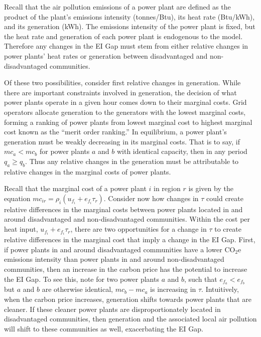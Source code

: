 Recall that the air pollution emissions of a power plant are defined as the product of the plant's emissions intensity (tonnes/Btu), its heat rate (Btu/kWh), and its generation (kWh). The emissions intensity of the power plant is fixed, but the heat rate and generation of each power plant is endogenous to the model. Therefore any changes in the EI Gap must stem from either relative changes in power plants' heat rates or generation between disadvantaged and non-disadvantaged communities. 

Of these two possibilities, consider first relative changes in generation. While there are important constraints involved in generation, the decision of what power plants operate in a given hour comes down to their marginal costs. Grid operators allocate generation to the generators with the lowest marginal costs, forming a ranking of power plants from lowest marginal cost to highest marginal cost known as the ``merit order ranking.'' In equilibrium, a power plant's generation must be weakly decreasing in its marginal costs. That is to say, if $mc_{a} < mc_{b}$ for power plants $a$ and $b$ with identical capacity, then in any period $q_a \geq q_b$. Thus any relative changes in the generation must be attributable to relative changes in the marginal costs of power plants. 

Recall that the marginal cost of a power plant $i$ in region $r$ is given by the equation $mc_{ir} = \rho_i(u_{f_i} + e_{f_i} \tau_r)$. Consider now how changes in $\tau$ could create relative differences in the marginal costs between power plants located in and around disadvantaged and non-disadvantaged communities. Within the cost per heat input, $u_{f_i} + e_{f_i} \tau_r$, there are two opportunities for a change in $\tau$ to create relative differences in the marginal cost that imply a change in the EI Gap. First, if power plants in and around disadvantaged communities have a lower CO$_2$e emissions intensity than power plants in and around non-disadvantaged communities, then an increase in the carbon price has the potential to increase the EI Gap. To see this, note for two power plants $a$ and $b$, such that $e_{f_a} < e_{f_b}$ but $a$ and $b$ are otherwise identical, $mc_{b} - mc_a$ is increasing in $\tau$. Intuitively, when the carbon price increases, generation shifts towards power plants that are cleaner. If these cleaner power plants are disproportionately located in disadvantaged communities, then generation and the associated local air pollution will shift to these communities as well, exacerbating the EI Gap.

